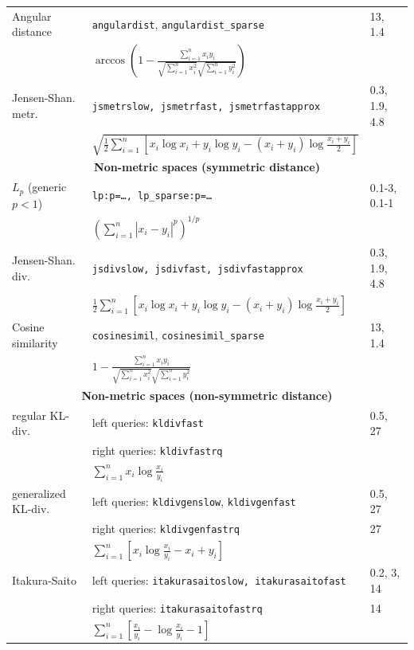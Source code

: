 \documentclass[runningheads,a4paper]{llncs}
\newcommand{\ttt}[1]{\texttt{#1}}
\begin{document}
{\begin{table}
\begin{tabular}{l@{\hspace{2mm}}l@{\hspace{2mm}}l}
\cmidrule(l){1-3} 
Angular distance & \ttt{angulardist}, \ttt{angulardist\_sparse} & { 13, 1.4 } \\
                        & $\arccos\left(1-\frac{\sum_{i=1}^n x_i y_i}{\sqrt{\sum_{i=1}^n x_i^2}\sqrt{\sum_{i=1}^n y_i^2 }}\right)$   & \\
\cmidrule(l){1-3} 
Jensen-Shan. metr. &\ttt{jsmetrslow, jsmetrfast, jsmetrfastapprox} &  0.3, 1.9, 4.8  \\
                          & $\sqrt{\frac{1}{2}\sum_{i=1}^n \left[x_i \log x_i + y_i \log y_i  - (x_i+y_i)\log \frac{x_i +y_i}{2}\right]}$  & \vspace{1em} \\
\toprule
\multicolumn{3}{c}{\textbf{Non-metric spaces (symmetric distance)}}  \\
\toprule
$L_p$ (generic $p < 1$)& \ttt{lp:p=\ldots, lp\_sparse:p=\ldots}                     &  0.1-3, 0.1-1 \\
                              & $\left(\sum_{i=1}^n |x_i-y_i|^p\right)^{1/p}$  &   \\
\cmidrule(l){1-3} 
Jensen-Shan. div. &\ttt{jsdivslow, jsdivfast, jsdivfastapprox} &   0.3, 1.9, 4.8 \\
                          & $\frac{1}{2}\sum_{i=1}^n \left[x_i \log x_i + y_i \log y_i  - (x_i+y_i)\log \frac{x_i +y_i}{2}\right]$ & \\
\cmidrule(l){1-3} 
Cosine similarity & \ttt{cosinesimil}, \ttt{cosinesimil\_sparse} & { 13, 1.4 } \\
                        & $1-\frac{\sum_{i=1}^n x_i y_i}{\sqrt{\sum_{i=1}^n x_i^2}\sqrt{\sum_{i=1}^n y_i^2 }}$   & \vspace{1em} \\
\toprule
\multicolumn{3}{c}{\textbf{Non-metric spaces (non-symmetric distance)}}  \\
\toprule
regular KL-div. & left queries: \ttt{kldivfast}       & 0.5, 27 \\
                       & right queries: \ttt{kldivfastrq}    &  \\
                       & $\sum_{i=1}^n   x_i \log \frac{x_i}{y_i}$  & \\ 
\cmidrule(l){1-3} 
generalized KL-div. & left queries: \ttt{kldivgenslow}, \ttt{kldivgenfast} & 0.5, 27    \\
                           & right queries: \ttt{kldivgenfastrq} & 27    \\
                           & $\sum_{i=1}^n \left[  x_i \log \frac{x_i}{y_i} -   x_i +   y_i \right]$   &   \\
\cmidrule(l){1-3} 
Itakura-Saito & left queries: \ttt{itakurasaitoslow, itakurasaitofast}   & 0.2, 3, 14 \\
              & right queries: \ttt{itakurasaitofastrq}                  & 14         \\
              & $\sum_{i=1}^n \left[ \frac{ x_i}{y_i} - \log \frac{x_i}{y_i}  -1 \right]$ \\
\toprule
\end{tabular}
\end{table}

}
\end{document}
